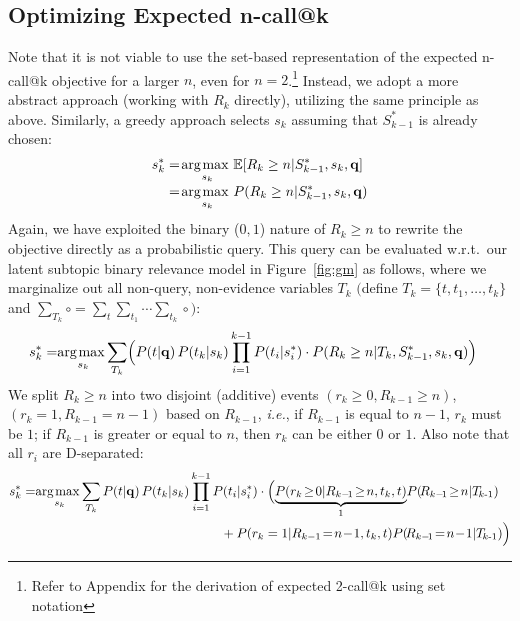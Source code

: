 \subsection{Optimizing Expected n-call@k}
Note that it is not viable to use the set-based representation of the expected n-call@k objective for a larger $n$, even for $n=2$.\footnote{Refer to Appendix for the derivation of expected 2-call@k using set notation} Instead, we adopt a more abstract approach (working with $R_k$ directly), utilizing the same principle as above. 
Similarly, a greedy approach selects $s_k$
assuming that $S_{k-1}^*$ is already chosen:
\begin{align}
  s_k^* & = \argmax_{s_k} \mathbb{E}[R_k\geq n|S_{k-1}^*,s_k,\vec{q}] \nonumber\\[-1mm]
  & = \argmax_{s_k} P(R_k\geq n|S_{k-1}^*,s_k,\vec{q}) \nonumber 
\end{align}
Again, we have 
exploited the binary ($0,1$) nature of $R_k \geq n$ to rewrite the objective
directly as a probabilistic query.
This query can be evaluated w.r.t.\ our latent subtopic binary relevance
model in Figure~\ref{fig:gm} as follows, where we marginalize out
all non-query, non-evidence variables $T_k$ $\big($define
$T_k\!=\!\{t,t_1,\dots,t_k\}$ and 
$\sum_{T_k} \circ = \sum_t \sum_{t_1} \cdots \sum_{t_k} \circ \big)$:
\begin{align}
  s_k^* = & \argmax_{s_k} \!\sum_{T_k} \Bigl( P(t|\vec{q}) \,P(t_k|s_k) \prod_{i=1}^{k-1} P(t_i|s_i^*) \cdot P(R_k\geq n|T_k,S_{k-1}^*,s_k,\vec{q}) \Bigr) \nonumber 
\end{align}
We split $R_k \geq n$ into two disjoint (additive) events
$(r_k \! \geq \! 0,\! R_{k\!-\!1}\!\geq \!n)$, $(r_k\!\!=\!\!1,\!R_{k\!-\!1}\!\!=\!\!n\!-\!1)$ based on $R_{k-1}$, \emph{i.e.}, if $R_{k-1}$ is equal to $n-1$, $r_k$ must be $1$; if $R_{k-1}$ is greater or equal to $n$, then $r_k$ can be either $0$ or $1$. Also note that all $r_i$ are D-separated:
\begin{align}
 s_k^* = & \argmax_{s_k} \!\sum_{T_k} P(t|\vec{q}) \,P(t_k|s_k) \prod_{i=1}^{k-1} P(t_i|s_i^*) \cdot \Bigl( \mbox{$\underbrace{P(r_k\!\geq\!0|R_{k-\!1}\!\geq\!n,t_k,t)}_{1}$} P(\!R_{k-\!1}\!\geq\!n|\TlessK) \nonumber \\
  & \hspace{50mm} + P(r_k=1|R_{k-1}\!=\!n\!-\!1,t_k,t) P(\!R_{k-\!1}\!=\!n\!-\!1|\TlessK) \Big) \nonumber 
\end{align}
